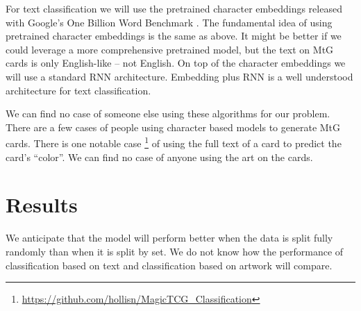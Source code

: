 \documentclass{article}
\begin{document}
For text classification we will use the pretrained character embeddings
released with Google's One Billion Word Benchmark
\cite{one-billion-words}.
The fundamental idea of using pretrained character embeddings
is the same as above.
It might be better if we could leverage a more comprehensive pretrained model,
but the text on MtG cards is only English-like -- not English.
On top of the character embeddings
we will use a standard RNN architecture.
Embedding plus RNN is a well understood architecture for text classification.

We can find no case of someone else using these algorithms for our problem.
There are a few cases of people using character based models
to generate MtG cards.
There is one notable case
\footnote{\url{https://github.com/hollisn/MagicTCG_Classification}}
of using the full text of a card to predict the card's ``color''.
We can find no case of anyone using the art on the cards.

\section*{Results}

We anticipate that the model will perform better
when the data is split fully randomly
than when it is split by set.
We do not know how the performance of
classification based on text
and classification based on artwork will compare.


{}

\end{document}
